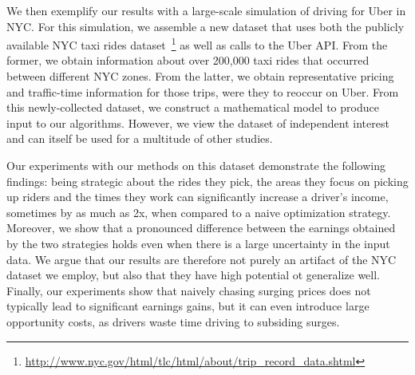 We then exemplify our  results with a large-scale simulation of driving for Uber in NYC. 
For this simulation, we assemble a new dataset that uses both the publicly available NYC taxi rides 
dataset~\footnote{\url{http://www.nyc.gov/html/tlc/html/about/trip_record_data.shtml}} as well as calls to the Uber API.
From the former, we obtain information about over 200,000 taxi rides that occurred between different NYC zones. 
From the latter, we obtain representative pricing and traffic-time information for those trips, were they to reoccur on Uber.
From this newly-collected dataset, we construct a mathematical model to produce input to our algorithms. However, 
  we view the dataset of independent interest and can itself be used for a multitude of other studies.

Our experiments with our methods on this dataset demonstrate the following findings:
being strategic about the rides they pick, the areas they focus on picking up riders
and the times they work can significantly increase a driver's income, sometimes by
as much as 2x, when compared to a naive optimization strategy.
Moreover, we show that a pronounced difference between the earnings obtained by the 
two strategies holds even when there is a large uncertainty in the input data. 
We argue that our results are therefore not purely an artifact of the NYC dataset we employ, 
  but also that they have high potential ot generalize well.
Finally, our experiments show that naively chasing surging prices does not typically lead 
  to significant earnings gains, but it can even introduce large opportunity costs, as drivers
  waste time driving to subsiding surges. 
